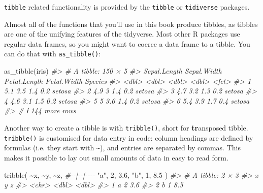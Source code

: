 \documentclass[
]{article}
\newenvironment{Shaded}{}{}
\newcommand{\CommentTok}[1]{\textcolor[rgb]{0.38,0.63,0.69}{\textit{#1}}}
\newcommand{\DecValTok}[1]{\textcolor[rgb]{0.25,0.63,0.44}{#1}}
\newcommand{\FloatTok}[1]{\textcolor[rgb]{0.25,0.63,0.44}{#1}}
\newcommand{\FunctionTok}[1]{\textcolor[rgb]{0.02,0.16,0.49}{#1}}
\newcommand{\NormalTok}[1]{#1}
\newcommand{\SpecialCharTok}[1]{\textcolor[rgb]{0.25,0.44,0.63}{#1}}
\newcommand{\StringTok}[1]{\textcolor[rgb]{0.25,0.44,0.63}{#1}}
\begin{document}
\texttt{tibble} related functionality is provided by the \texttt{tibble}
or \texttt{tidiverse} packages.

Almost all of the functions that you'll use in this book produce
tibbles, as tibbles are one of the unifying features of the tidyverse.
Most other R packages use regular data frames, so you might want to
coerce a data frame to a tibble. You can do that with
\texttt{as\_tibble()}:

\begin{Shaded}
\begin{Highlighting}[]
\FunctionTok{as\_tibble}\NormalTok{(iris)}
\CommentTok{\#\textgreater{} \# A tibble: 150 × 5}
\CommentTok{\#\textgreater{}   Sepal.Length Sepal.Width Petal.Length Petal.Width Species}
\CommentTok{\#\textgreater{}          \textless{}dbl\textgreater{}       \textless{}dbl\textgreater{}        \textless{}dbl\textgreater{}       \textless{}dbl\textgreater{} \textless{}fct\textgreater{}  }
\CommentTok{\#\textgreater{} 1          5.1         3.5          1.4         0.2 setosa }
\CommentTok{\#\textgreater{} 2          4.9         3            1.4         0.2 setosa }
\CommentTok{\#\textgreater{} 3          4.7         3.2          1.3         0.2 setosa }
\CommentTok{\#\textgreater{} 4          4.6         3.1          1.5         0.2 setosa }
\CommentTok{\#\textgreater{} 5          5           3.6          1.4         0.2 setosa }
\CommentTok{\#\textgreater{} 6          5.4         3.9          1.7         0.4 setosa }
\CommentTok{\#\textgreater{} \# ℹ 144 more rows}
\end{Highlighting}
\end{Shaded}

Another way to create a tibble is with \texttt{tribble()}, short for
\textbf{tr}ansposed tibble. \texttt{tribble()} is customised for data
entry in code: column headings are defined by formulas (i.e. they start
with \texttt{\textasciitilde{}}), and entries are separated by commas.
This makes it possible to lay out small amounts of data in easy to read
form.

\begin{Shaded}
\begin{Highlighting}[]
\FunctionTok{tribble}\NormalTok{(}
  \SpecialCharTok{\textasciitilde{}}\NormalTok{x, }\SpecialCharTok{\textasciitilde{}}\NormalTok{y, }\SpecialCharTok{\textasciitilde{}}\NormalTok{z,}
  \CommentTok{\#{-}{-}|{-}{-}|{-}{-}{-}{-}}
  \StringTok{"a"}\NormalTok{, }\DecValTok{2}\NormalTok{, }\FloatTok{3.6}\NormalTok{,}
  \StringTok{"b"}\NormalTok{, }\DecValTok{1}\NormalTok{, }\FloatTok{8.5}
\NormalTok{)}
\CommentTok{\#\textgreater{} \# A tibble: 2 × 3}
\CommentTok{\#\textgreater{}   x         y     z}
\CommentTok{\#\textgreater{}   \textless{}chr\textgreater{} \textless{}dbl\textgreater{} \textless{}dbl\textgreater{}}
\CommentTok{\#\textgreater{} 1 a         2   3.6}
\CommentTok{\#\textgreater{} 2 b         1   8.5}
\end{Highlighting}
\end{Shaded}
\end{document}
